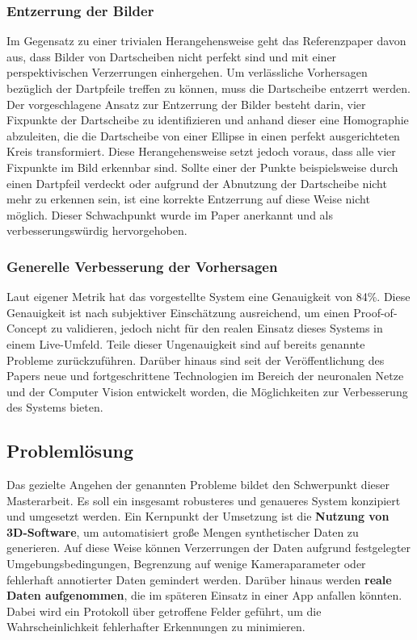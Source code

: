 \subsubsection{Entzerrung der Bilder}
\label{sec:ziele:schwachstellen:entzerrung}

Im Gegensatz zu einer trivialen Herangehensweise geht das Referenzpaper davon aus, dass Bilder von Dartscheiben nicht perfekt sind und mit einer perspektivischen Verzerrungen einhergehen. Um verlässliche Vorhersagen bezüglich der Dartpfeile treffen zu können, muss die Dartscheibe entzerrt werden. Der vorgeschlagene Ansatz zur Entzerrung der Bilder besteht darin, vier Fixpunkte der Dartscheibe zu identifizieren und anhand dieser eine Homographie abzuleiten, die die Dartscheibe von einer Ellipse in einen perfekt ausgerichteten Kreis transformiert. Diese Herangehensweise setzt jedoch voraus, dass alle vier Fixpunkte im Bild erkennbar sind. Sollte einer der Punkte beispielsweise durch einen Dartpfeil verdeckt oder aufgrund der Abnutzung der Dartscheibe nicht mehr zu erkennen sein, ist eine korrekte Entzerrung auf diese Weise nicht möglich. Dieser Schwachpunkt wurde im Paper anerkannt und als verbesserungswürdig hervorgehoben.

\subsubsection{Generelle Verbesserung der Vorhersagen}
\label{sec:ziele:schwachstellen:verbesserung}

Laut eigener Metrik hat das vorgestellte System eine Genauigkeit von 84\%. Diese Genauigkeit ist nach subjektiver Einschätzung ausreichend, um einen Proof-of-Concept zu validieren, jedoch nicht für den realen Einsatz dieses Systems in einem Live-Umfeld. Teile dieser Ungenauigkeit sind auf bereits genannte Probleme zurückzuführen. Darüber hinaus sind seit der Veröffentlichung des Papers neue und fortgeschrittene Technologien im Bereich der neuronalen Netze und der Computer Vision entwickelt worden, die Möglichkeiten zur Verbesserung des Systems bieten.


\subsection{Problemlösung}
\label{sec:ziele:problemlösung}

Das gezielte Angehen der genannten Probleme bildet den Schwerpunkt dieser Masterarbeit. Es soll ein insgesamt robusteres und genaueres System konzipiert und umgesetzt werden. Ein Kernpunkt der Umsetzung ist die \textbf{Nutzung von 3D-Software}, um automatisiert große Mengen synthetischer Daten zu generieren. Auf diese Weise können Verzerrungen der Daten aufgrund festgelegter Umgebungsbedingungen, Begrenzung auf wenige Kameraparameter oder fehlerhaft annotierter Daten gemindert werden. Darüber hinaus werden \textbf{reale Daten aufgenommen}, die im späteren Einsatz in einer App anfallen könnten. Dabei wird ein Protokoll über getroffene Felder geführt, um die Wahrscheinlichkeit fehlerhafter Erkennungen zu minimieren.

